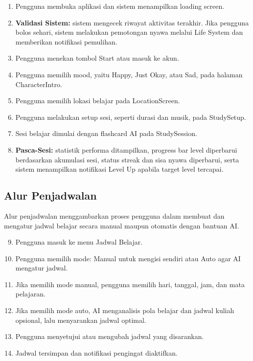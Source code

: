 \documentclass[11pt]{article}
\begin{document}
\begin{enumerate}[label=\arabic*.]
    \item Pengguna membuka aplikasi dan sistem menampilkan loading screen.
    \item \textbf{Validasi Sistem:} sistem mengecek riwayat aktivitas terakhir. Jika pengguna bolos sehari, sistem melakukan pemotongan nyawa melalui Life System dan memberikan notifikasi pemulihan.
    \item Pengguna menekan tombol Start atau masuk ke akun.
    \item Pengguna memilih mood, yaitu Happy, Just Okay, atau Sad, pada halaman CharacterIntro.
    \item Pengguna memilih lokasi belajar pada LocationScreen.
    \item Pengguna melakukan setup sesi, seperti durasi dan musik, pada StudySetup.
    \item Sesi belajar dimulai dengan flashcard AI pada StudySession.
    \item \textbf{Pasca-Sesi:} statistik performa ditampilkan, progress bar level diperbarui berdasarkan akumulasi sesi, status streak dan sisa nyawa diperbarui, serta sistem menampilkan notifikasi Level Up apabila target level tercapai.
\end{enumerate}

\subsection{Alur Penjadwalan}

Alur penjadwalan menggambarkan proses pengguna dalam membuat dan mengatur jadwal belajar secara manual maupun otomatis dengan bantuan AI.

\begin{enumerate}[label=\arabic*.]
    \setcounter{enumi}{8}
    \item Pengguna masuk ke menu Jadwal Belajar.
    \item Pengguna memilih mode: Manual untuk mengisi sendiri atau Auto agar AI mengatur jadwal.
    \item Jika memilih mode manual, pengguna memilih hari, tanggal, jam, dan mata pelajaran.
    \item Jika memilih mode auto, AI menganalisis pola belajar dan jadwal kuliah opsional, lalu menyarankan jadwal optimal.
    \item Pengguna menyetujui atau mengubah jadwal yang disarankan.
    \item Jadwal tersimpan dan notifikasi pengingat diaktifkan.
\end{enumerate}
\end{document}
